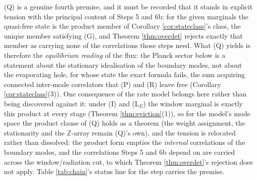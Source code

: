 \documentclass[11pt]{article}
\theoremstyle{definition}
\begin{document}
(Q) is a genuine fourth premise, and it must be recorded that it stands in explicit tension with the principal content of Steps 5 and 6b: for the given marginals the quasi-free state is the product member of Corollary \ref{cor:stateclass}'s class, the unique member satisfying (G), and Theorem \ref{thm:overdet} rejects exactly that member as carrying none of the correlations those steps need. What (Q) yields is therefore the \emph{equilibrium reading} of the flux: the Planck sector below is a statement about the stationary idealisation of the boundary modes, not about the evaporating hole, for whose state the exact formula fails, the sum acquiring connected inter-mode correlators that (P) and (R) leave free (Corollary \ref{cor:stateclass}(3)). One consequence of the rate model belongs here rather than being discovered against it: under (I) and (L$_E$) the window marginal is exactly this product at every stage (Theorem \ref{thm:eviction}(1)), so for the model's mode space the product clause of (Q) holds as a theorem (the weight assignment, the stationarity and the $\mathbb{Z}$-array remain (Q)'s own), and the tension is relocated rather than dissolved: the product form empties the \emph{internal} correlations of the boundary modes, and the correlations Steps 5 and 6b depend on are carried across the window/radiation cut, to which Theorem \ref{thm:overdet}'s rejection does not apply. Table \ref{tab:chain}'s status line for the step carries the premise.
\end{document}
